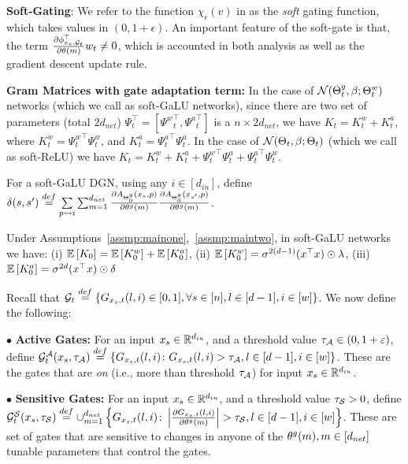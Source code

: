  \textbf{Soft-Gating}: We refer to the function $\chi_\epsilon(v)$ in  as the \emph{soft} gating function, which takes values in $(0,1+\epsilon)$.  An important feature of the soft-gate is that, the term $\frac{\partial \phi_{x_s,\G_t }^\top}{\partial \theta(m)} w_{t}\neq 0$, which is accounted in both analysis as well as the gradient descent update rule.
 
 
\textbf{Gram Matrices with gate adaptation term:} In the case of $\N(\Tg_t,\beta;\Tw_t)$ networks (which we call as soft-GaLU networks), since there are two set of parameters (total $2d_{net}$) $\Psi_t^\top=[{\Psi^w}^\top_t,{\Psi^a}^\top_t]$ is a $n\times 2d_{net}$, we have $K_t=K^w_t+K^a_t$,  where $K^w_t={\Psi^w_t}^\top \Psi^w_t$, and $K^a_t={\Psi^a_t}^\top \Psi^a_t$. In the case of $\N(\Theta_t,\beta;\Theta_t)$ (which we call as soft-ReLU)  we have $K_t={K^w_t}+{K^a_t}+{\Psi^w_t}^\top {\Psi^a_t}+{\Psi^a_t}^\top {\Psi^w_t}$.

\begin{definition} 
For a soft-GaLU DGN, using any $i\in[d_{in}]$, define $\delta(s,s')\stackrel{def}= \underset{{p\rsa i}}{\sum} \sum_{m=1}^{d_{net}}\frac{\partial A_{\Tg_0}(x_s,p)}{\partial \tg(m)} \frac{\partial A_{\Tg_0}(x_{s'},p)}{\partial \tg(m)}$.
\end{definition}

\begin{lemma} Under Assumptions~\ref{assmp:mainone},~\ref{assmp:maintwo}, in soft-GaLU networks we have: (i) $\E{K_0}=\E{K^w_0}+\E{K^a_0}$, 
 (ii) $\E{K^w_0}=\sigma^{2(d-1)} (x^\top x)\odot \lambda$,  (iii) $\E{K^a_0}=\sigma^{2d}  (x^\top x)\odot \delta$
\end{lemma}

Recall that $\G_t\stackrel{def}=\{G_{x_{s},t}(l,i) \in [0,1], \forall s\in[n],l\in[d-1],i\in[w]\}$. We now define the following:

$\bullet$ \textbf{Active Gates:} For an input $x_{s}\in \R^{d_{in}}$, and a threshold value $\tau_{\A}\in (0,1+\epsilon)$, define $\G_t^{\A}(x_s,\tau_{\A})\stackrel{def}=\left\{G_{x_s,t}(l,i)\colon G_{x_s,t}(l,i)> \tau_{\A}, l\in[d-1],i\in[w]\right\}$. These are the gates that are \emph{on} (i.e., more than threshold $\tau_{\A}$) for input $x_s\in\R^{d_{in}}$.

$\bullet$ \textbf{Sensitive Gates:} For an input $x_{s}\in \R^{d_{in}}$, and a threshold value $\tau_{\S}>0$, define $\G_{t}^{\S}(x_s,\tau_{\S})\stackrel{def}=\cup_{m=1}^{d_{net}}\left\{G_{x_s,t}(l,i)\colon \left|\frac{\partial G_{x_s,t}(l,i)}{\partial \tg(m)}\right| >\tau_{\S},l\in[d-1],i\in[w] \right\}$. These are set of gates that are sensitive to changes in anyone of the $\tg(m),m\in[d_{net}]$ tunable parameters that control the gates.

